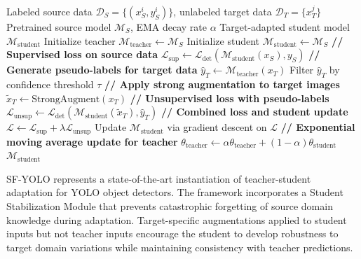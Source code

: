 \begin{algorithm}[htbp]
\caption{Teacher-Student Domain Adaptation for Object Detection}
\label{alg:teacher_student}
\begin{algorithmic}[1]
\Require Labeled source data $\mathcal{D}_S = \{(x_S^i, y_S^i)\}$, unlabeled target data $\mathcal{D}_T = \{x_T^j\}$
\Require Pretrained source model $\mathcal{M}_S$, EMA decay rate $\alpha$
\Ensure Target-adapted student model $\mathcal{M}_{\text{student}}$
\State Initialize teacher $\mathcal{M}_{\text{teacher}} \leftarrow \mathcal{M}_S$
\State Initialize student $\mathcal{M}_{\text{student}} \leftarrow \mathcal{M}_S$
        \State \textbf{// Supervised loss on source data}
        \State $\mathcal{L}_{\text{sup}} \leftarrow \mathcal{L}_{\text{det}}(\mathcal{M}_{\text{student}}(x_S), y_S)$
        \State \textbf{// Generate pseudo-labels for target data}
        \State $\hat{y}_T \leftarrow \mathcal{M}_{\text{teacher}}(x_T)$
        \State Filter $\hat{y}_T$ by confidence threshold $\tau$
        \State \textbf{// Apply strong augmentation to target images}
        \State $\tilde{x}_T \leftarrow \text{StrongAugment}(x_T)$
        \State \textbf{// Unsupervised loss with pseudo-labels}
        \State $\mathcal{L}_{\text{unsup}} \leftarrow \mathcal{L}_{\text{det}}(\mathcal{M}_{\text{student}}(\tilde{x}_T), \hat{y}_T)$
        \State \textbf{// Combined loss and student update}
        \State $\mathcal{L} \leftarrow \mathcal{L}_{\text{sup}} + \lambda \mathcal{L}_{\text{unsup}}$
        \State Update $\mathcal{M}_{\text{student}}$ via gradient descent on $\mathcal{L}$
        \State \textbf{// Exponential moving average update for teacher}
        \State $\theta_{\text{teacher}} \leftarrow \alpha \theta_{\text{teacher}} + (1 - \alpha) \theta_{\text{student}}$
    \EndFor
\EndFor
\State \Return $\mathcal{M}_{\text{student}}$
\end{algorithmic}
\end{algorithm}

SF-YOLO represents a state-of-the-art instantiation of teacher-student adaptation for YOLO object detectors. The framework incorporates a Student Stabilization Module that prevents catastrophic forgetting of source domain knowledge during adaptation. Target-specific augmentations applied to student inputs but not teacher inputs encourage the student to develop robustness to target domain variations while maintaining consistency with teacher predictions.

